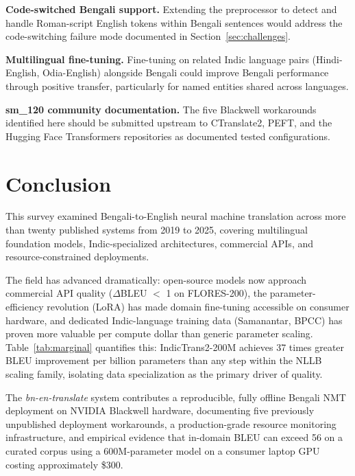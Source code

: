 \documentclass[conference]{IEEEtran}
\begin{document}
\textbf{Code-switched Bengali support.}
Extending the preprocessor to detect and handle Roman-script English
tokens within Bengali sentences would address the code-switching failure
mode documented in Section~\ref{sec:challenges}.

\textbf{Multilingual fine-tuning.}
Fine-tuning on related Indic language pairs (Hindi-English,
Odia-English) alongside Bengali could improve Bengali performance
through positive transfer, particularly for named entities shared
across languages.

\textbf{sm\_120 community documentation.}
The five Blackwell workarounds identified here should be submitted
upstream to CTranslate2, PEFT, and the Hugging Face Transformers
repositories as documented tested configurations.

\section{Conclusion}
\label{sec:conclusion}

This survey examined Bengali-to-English neural machine translation across
more than twenty published systems from 2019 to 2025, covering multilingual
foundation models, Indic-specialized architectures, commercial APIs, and
resource-constrained deployments.

The field has advanced dramatically: open-source models now approach
commercial API quality ($\Delta$BLEU $<$ 1 on FLORES-200), the
parameter-efficiency revolution (LoRA) has made domain fine-tuning
accessible on consumer hardware, and dedicated Indic-language training
data (Samanantar, BPCC) has proven more valuable per compute dollar than
generic parameter scaling.
Table~\ref{tab:marginal} quantifies this: IndicTrans2-200M achieves
37 times greater BLEU improvement per billion parameters than any step
within the NLLB scaling family, isolating data specialization as the
primary driver of quality.

The \textit{bn-en-translate} system contributes a reproducible,
fully offline Bengali NMT deployment on NVIDIA Blackwell hardware,
documenting five previously unpublished deployment workarounds, a
production-grade resource monitoring infrastructure, and empirical
evidence that in-domain BLEU can exceed 56 on a curated corpus using
a 600M-parameter model on a consumer laptop GPU costing approximately
\$300.
\end{document}
